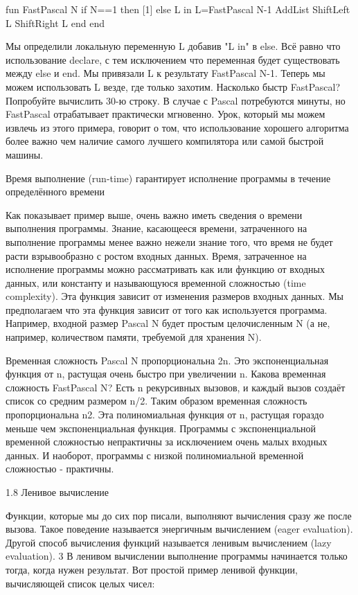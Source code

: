 fun {FastPascal N}
if N==1 then [1]
else L in
L={FastPascal N-1}
{AddList {ShiftLeft L} {ShiftRight L}}
end
end

Мы определили локальную переменную L добавив "L in" в else. Всё равно что использование declare, с тем исключением что переменная будет существовать между else и end. Мы привязали L к результату {FastPascal N-1}. Теперь мы можем использовать L везде, где только захотим. Насколько быстр FastPascal? Попробуйте вычислить 30-ю строку. В случае с Pascal потребуются минуты, но FastPascal отрабатывает практически мгновенно. Урок, который мы можем извлечь из этого примера, говорит о том, что использование хорошего алгоритма более важно чем наличие самого лучшего компилятора или самой быстрой машины.

Время выполнение (run-time) гарантирует исполнение программы в течение определённого времени

Как показывает пример выше, очень важно иметь сведения о времени выполнения программы. Знание, касающееся времени, затраченного на выполнение программы менее важно нежели знание того, что время не будет расти взрывообразно с ростом входных данных. Время, затраченное на исполнение программы можно рассматривать как или функцию от входных данных, или константу и называющуюся временной сложностью (time complexity). Эта функция зависит от изменения размеров входных данных. Мы предполагаем что эта функция зависит от того как используется программа. Например, входной размер {Pascal N} будет простым целочисленным N (а не, например, количеством памяти, требуемой для хранения N).

Временная сложность {Pascal N} пропорциональна 2n. Это экспоненциальная функция от n, растущая очень быстро при увеличении n. Какова временная сложность {FastPascal N}? Есть n рекурсивных вызовов, и каждый вызов создаёт список со средним размером n/2. Таким образом временная сложность пропорциональна n2. Эта полиномиальная функция от n, растущая гораздо меньше чем экспоненциальная функция. Программы с экспоненциальной временной сложностью непрактичны за исключением очень малых входных данных. И наоборот, программы с низкой полиномиальной временной сложностью - практичны.

1.8 Ленивое вычисление

Функции, которые мы до сих пор писали, выполняют вычисления сразу же после вызова. Такое поведение называется энергичным вычислением (eager evaluation). Другой способ вычисления функций называется ленивым вычислением (lazy evaluation). 3 В ленивом вычислении выполнение программы начинается только тогда, когда нужен результат. Вот простой пример ленивой функции, вычисляющей список целых чисел:

